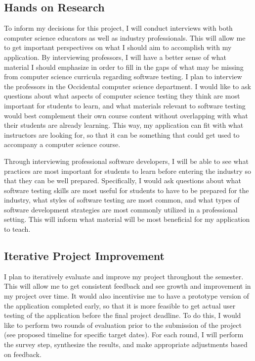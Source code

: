 \documentclass[10pt,twocolumn]{article}
\begin{document}
\subsection{Hands on Research}

To inform my decisions for this project, I will conduct interviews with both computer science educators as well as 
industry professionals. This will allow me to get important perspectives on what I should aim to accomplish with my 
application. By interviewing professors, I will have a better sense of what material I should emphasize in order to 
fill in the gaps of what may be missing from computer science curricula regarding software testing. I plan to interview 
the professors in the Occidental computer science department. I would like to ask questions about what aspects of 
computer science testing they think are most important for students to learn, and what materials relevant to software 
testing would best complement their own course content without overlapping with what their students are already 
learning. This way, my application can fit with what instructors are looking for, so that it can be something that 
could get used to accompany a computer science course. 

Through interviewing 
professional software developers, I will be able to see what practices are most important for students to learn before 
entering the industry so that they can be well prepared. Specifically, I would ask questions about what software testing skills are most 
useful for students to have to be prepared for the industry, what styles of software testing are most common, and what 
types of software development strategies are most commonly utilized in a professional setting. This will inform what 
material will be most beneficial for my application to teach. 

\subsection{Iterative Project Improvement}

I plan to
iteratively evaluate and improve my project throughout the semester. This will allow me to get consistent feedback and 
see growth and improvement in my project over time. It would also incentivise me to have a prototype version of the 
application completed early, so that it is more feasible to get actual user testing of the application before the final 
project deadline. To do this, I would like to perform two rounds of evaluation prior to the submission of the 
project (see proposed timeline for specific target dates). For each round, I will perform the survey step, synthesize 
the results, and make appropriate adjustments based on feedback. 
\end{document}
